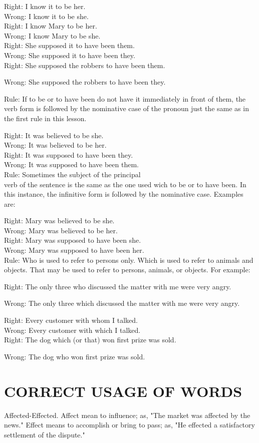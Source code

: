 \documentclass[10pt]{article}
\begin{document}
Right: I know it to be her.\\
Wrong: I know it to be she.\\
Right: I know Mary to be her.\\
Wrong: I know Mary to be she.\\
Right: She supposed it to have been them.\\
Wrong: She supposed it to have been they.\\
Right: She supposed the robbers to have been them.

Wrong: She supposed the robbers to have been they.

Rule: If to be or to have been do not have it immediately in front of them, the verb form is followed by the nominative case of the pronoun just the same as in the first rule in this lesson.

Right: It was believed to be she.\\
Wrong: It was believed to be her.\\
Right: It was supposed to have been they.\\
Wrong: It was supposed to have been them.\\
Rule: Sometimes the subject of the principal\\
verb of the sentence is the same as the one used wich to be or to have been. In this instance, the infinitive form is followed by the nominative case. Examples are:

Right: Mary was believed to be she.\\
Wrong: Mary was believed to be her.\\
Right: Mary was supposed to have been she.\\
Wrong: Mary was supposed to have been her.\\
Rule: Who is used to refer to persons only. Which is used to refer to animals and objects. That may be used to refer to persons, animals, or objects. For example:

Right: The only three who discussed the matter with me were very angry.

Wrong: The only three which discussed the matter with me were very angry.

Right: Every customer with whom I talked.\\
Wrong: Every customer with which I talked.\\
Right: The dog which (or that) won first prize was sold.

Wrong: The dog who won first prize was sold.

\section*{CORRECT USAGE OF WORDS}
Affected-Effected. Affect mean to influence; as, "The market was affected by the news." Effect means to accomplish or bring to pass; as, "He effected a satisfactory settlement of the dispute."
\end{document}
